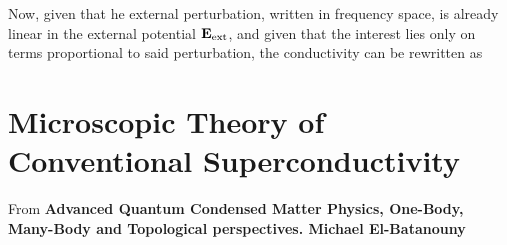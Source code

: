 \documentclass{homework}
\begin{document}
Now, given that he external perturbation, written in frequency space, is already linear in the external potential ${\bf E}_{\textnormal{ext}}$, and given that the interest lies only on terms proportional to said perturbation, the conductivity can be rewritten as 

\clearpage

\section{Microscopic Theory of Conventional Superconductivity}

From \textbf{Advanced Quantum Condensed Matter Physics, One-Body, Many-Body and Topological perspectives. Michael El-Batanouny} \\

\paragraph{\textbf{}}
\end{document}
